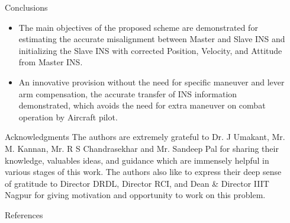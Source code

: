 \documentclass[final]{beamer}
\newlength{\sepwidth}
\newlength{\colwidth}
\newcommand{\separatorcolumn}{\begin{column}{\sepwidth}\end{column}}
\begin{document}
\begin{frame}[t]
\begin{columns}[t]
\begin{column}{\colwidth}
\begin{block}{Conclusions}
\begin{itemize}
    \item The   main   objectives   of   the   proposed   scheme   are demonstrated  for  estimating  the  accurate  misalignment between Master and Slave INS and initializing the Slave INS with corrected Position, Velocity, and Attitude from Master INS.
    \item An  innovative provision without  the  need for  specific maneuver  and lever  arm  compensation,  the  accurate transfer  of  INS  information  demonstrated,  which  avoids the  need  for  extra  maneuver  on  combat  operation  by Aircraft pilot.
\end{itemize}

\end{block}
    \begin{block}{Acknowledgments}
The authors are extremely grateful to Dr. J Umakant, Mr. M. Kannan, Mr. R S Chandrasekhar and Mr. Sandeep Pal for sharing their knowledge, valuables ideas, and guidance which are immensely helpful in various stages of this work. The authors also like to express their deep sense of gratitude to Director DRDL, Director RCI, and Dean & Director IIIT Nagpur for giving motivation and opportunity to work on this problem.

\end{block}

\begin{block}{References}




\end{block}
\end{column}

\separatorcolumn
\end{columns}
\end{frame}
\end{document}
